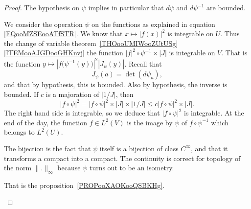 \begin{proof}
    The hypothesis on \( \psi\) implies in particular that \( d\psi\) and \( d\psi^{-1}\) are bounded.
    \begin{subproof}
        We consider the operation \( \psi\) on the functions as explained in equation \eqref{EQooMZSEooATfSTR}. We know that \( x\mapsto | f(x) |^2\) is integrable on \( U\). Thus the change of variable theorem~\ref{THOooUMIWooZUtUSg}\ref{ITEMooAJGDooGHKnvj} the function \( | f |^2\circ\psi^{-1}\times | J |\) is integrable on \( V\). That is the function \( y\mapsto | f\big( \psi^{-1}(y) \big) |^2| J_{\psi}(y) |\). Recall that
        \begin{equation}
            J_{\psi}(a)=\det(d\psi_a),
        \end{equation}
        and that by hypothesis, this is bounded. Also by hypothesis, the inverse is bounded. If \( c\) is a majoration of \( | 1/J |\), then
        \begin{equation}
            | f\circ\psi |^2=| f\circ\psi |^2\times | J |\times | 1/J |\leq c| f\circ\psi |^2\times | J |.
        \end{equation}
        The right hand side is integrable, so we deduce that \( | f\circ\psi |^2\) is integrable. At the end of the day, the function \( f\in L^2(V)\) is the image by \( \psi\) of \( f\circ\psi^{-1}\) which belongs to \( L^2(U)\).

        The bijection is the fact that \( \psi\) itself is a bijection of class \(  C^{\infty}\), and that it transforms a compact into a compact. The continuity is correct for topology of the norm \( \| . \|_{\infty}\) because \( \psi\) turns out to be an isometry.

        That is the proposition~\ref{PROPooXAOKooQSBKHg}.



\end{subproof}
\end{proof}
